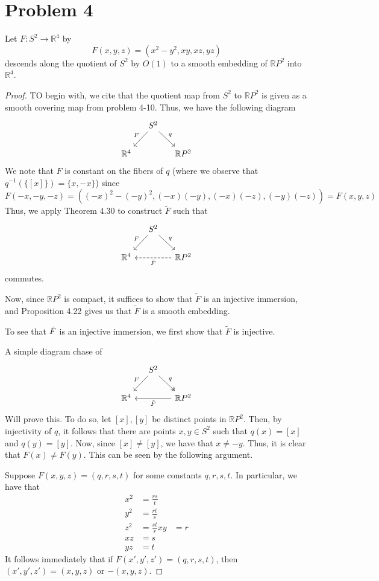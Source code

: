 \documentclass[fontsize=11pt]{scrartcl} %
\numberwithin{equation}{section} %
\numberwithin{figure}{section} %
\numberwithin{table}{section} %
\newcommand{\R}{\mathbb{R}}
\begin{document}
\section*{Problem 4} %
Let $F:S^2\to\R^4$ by
\[
F(x,y,z) = (x^2-y^2,xy,xz,yz)
\]
descends along the quotient of $S^2$ by $O(1)$ to a smooth embedding of $\R P^2$ into
$\R^4$.
\\
\begin{proof}
TO begin with, we cite that the quotient map from $S^2$ to $\R P^2$ is given as a smooth
covering map from problem 4-10. Thus, we have the following diagram
\[
\begin{tikzcd}[column sep=small]
 &S^2 \arrow[swap]{dl}{F} \arrow{dr}{q}& \\
\R^4 & & \R P^2
\end{tikzcd}
\]
We note that $F$ is constant on the fibers of $q$ (where we observe that $q^{-1}(\{[x]\}) = \{x,-x\}$)
since
\[
F(-x,-y,-z) = ((-x)^2 - (-y)^2,(-x)(-y),(-x)(-z),(-y)(-z)) = F(x,y,z)
\]
Thus, we apply Theorem 4.30 to construct $\tilde{F}$ such that
\[
\begin{tikzcd}[column sep=small]
 &S^2 \arrow[swap]{dl}{F} \arrow{dr}{q}& \\
\R^4 & & \R P^2\arrow[dashed]{ll}{\tilde{F}}
\end{tikzcd}
\]
commutes.

Now, since $\R P^2$ is compact, it suffices to show that $\tilde{F}$ is an injective
immersion, and Proposition 4.22 gives us that $\tilde{F}$ is a smooth embedding.

To see that $\Tilde{F}$ is an injective immersion, we first show that $\tilde{F}$ is 
injective.

A simple diagram chase of
\[
\begin{tikzcd}[column sep=small]
 &S^2 \arrow[swap]{dl}{F} \arrow[two heads]{dr}{q}& \\
\R^4 & & \R P^2\arrow{ll}{\tilde{F}}
\end{tikzcd}
\]
Will prove this. To do so, let $[x],[y]$ be distinct points in $\R P^2$. Then, by injectivity
of $q$, it follows that there are points $x,y\in S^2$ such that $q(x) = [x]$ and $q(y) = [y]$.
Now, since $[x]\neq[y]$, we have that $x\neq -y$. Thus, it is clear that $F(x)\neq F(y)$.
This can be seen by the following argument.

Suppose $F(x,y,z) = (q,r,s,t)$ for some constants $q,r,s,t$. In particular, we have that
\[
\begin{aligned}
x^2 &= \frac{rs}{t}\\
y^2 &= \frac{rt}{s}\\
z^2 &= \frac{st}{r}
xy  &= r\\
xz  &= s\\
yz  &= t 
\end{aligned}
\]
It follows immediately that if $F(x',y',z') = (q,r,s,t)$, then $(x',y',z') = (x,y,z)$ or $-(x,y,z)$.


\end{proof}
\end{document}
